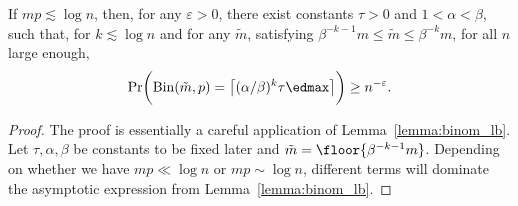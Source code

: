 \begin{lemma}
\label{lemma:geom_alg}
    If \(mp \lesssim \log n\), then, for any \(\varepsilon > 0\), there exist constants \(\tau > 0\) and \(1 < \alpha < \beta\), such that, for \(k \lesssim \log n\) and for any \(\tilde m\), satisfying \(\beta^{-k-1}m \leq \tilde m \leq \beta^{-k} m\), for all \(n\) large enough,
    \begin{equation*}
        \Pr\biggl(\mathrm{Bin}(\tilde m, p) = \bigl\lceil (\alpha / \beta)^{k} \tau \edmax\bigr\rceil \biggr) \geq n^{-\varepsilon}.
    \end{equation*}
\end{lemma}
\begin{proof}
    The proof is essentially a careful application of Lemma~\ref{lemma:binom_lb}.
    Let \(\tau, \alpha, \beta\) be constants to be fixed later and \(\tilde m = \floor{\beta^{-k-1}m}\). Depending on whether we have \(mp \ll \log n\) or \(mp \sim \log n\), different terms will dominate the asymptotic expression from Lemma~\ref{lemma:binom_lb}.


\end{proof}

